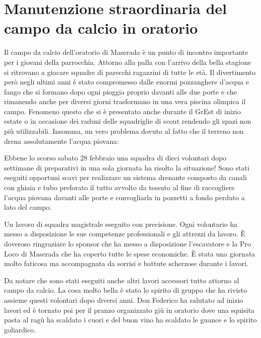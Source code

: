 \section{Manutenzione straordinaria del campo da calcio in oratorio}

Il campo da calcio dell'oratorio di Maserada è un punto di incontro importante per i giovani della parrocchia. Attorno alla palla con l'arrivo della bella stagione si ritrovano a giocare squadre di parecchi ragazzini di tutte le età. Il divertimento però negli ultimi anni è stato compromesso dalle enormi pozzanghere d'acqua e fango che si formano dopo ogni pioggia proprio davanti alle due porte e che rimanendo anche per diversi giorni trasformano in una vera piscina olimpica il campo. Fenomeno questo che si è presentato anche durante il GrEst di inizio estate o in occasione dei raduni delle squadriglie di scout rendendo gli spazi non più utilizzabili. Insomma, un vero problema dovuto al fatto che il terreno non drena assolutamente l'acqua piovana:


Ebbene lo scorso sabato 28 febbraio una squadra di dieci volontari dopo settimane di preparativi in una sola giornata ha risolto la situazione! Sono stati eseguiti opportuni scavi per realizzare un sistema drenante composto da canali con ghiaia e tubo preforato il tutto avvolto da tessuto al fine di raccogliere l'acqua piovana davanti alle porte e convogliarla in pozzetti a fondo perduto a lato del campo.

Un lavoro di squadra magistrale eseguito con precisione. Ogni volontario ha messo a disposizione le sue competenze professionali e gli attrezzi da lavoro. È doveroso ringraziare lo sponsor che ha messo a disposizione l'escavatore e la Pro Loco di Maserada che ha coperto tutte le spese economiche. È stata una giornata molto faticosa ma accompagnata da sorrisi e battute scherzose durante i lavori.  


Da notare che sono stati eseguiti anche altri lavori accessori tutto attorno al campo da calcio. La cosa molto bella è stato lo spirito di gruppo che ha rivisto assieme questi volontari dopo diversi anni. Don Federico ha salutato ad inizio lavori ed è tornato poi per il pranzo organizzato giù in oratorio dove una squisita pasta al ragù ha scaldato i cuori e del buon vino ha scaldato le guance e lo spirito goliardico.


